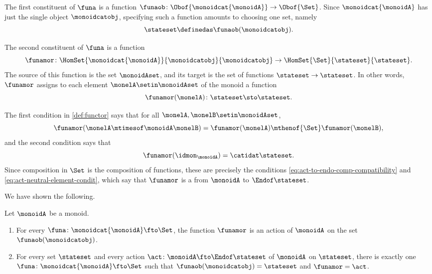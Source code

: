 The first constituent of $\funa$ is a function $\funaob \colon \Obof{\monoidcat{\monoidA}} \to \Obof{\Set}$.
Since $\monoidcat{\monoidA}$ has just the single object $\monoidcatobj$, specifying such a function amounts to choosing one set, namely
\begin{equation}
    \stateset \definedas \funaob(\monoidcatobj).
\end{equation}

The second constituent of $\funa$ is a function
\begin{equation}
    \funamor \colon \HomSet{\monoidcat{\monoidA}}{\monoidcatobj}{\monoidcatobj} \to \HomSet{\Set}{\stateset}{\stateset}.
\end{equation}
The source of this function is the set $\monoidAset$, and its target is the set of functions $\stateset \to \stateset$.
In other words, $\funamor$ assigns to each element $\monelA \setin \monoidAset$ of the monoid a function
\begin{equation}
    \funamor(\monelA) \colon \stateset \sto \stateset.
\end{equation}

The first condition in \cref{def:functor} says that for all $\monelA, \monelB \setin \monoidAset$,
\begin{equation}
    \funamor(\monelA \mtimesof\monoidA \monelB) = \funamor(\monelA) \mthenof{\Set} \funamor(\monelB),
\end{equation}
and the second condition says that
\begin{equation}
    \funamor(\idmon_\monoidA) = \catidat\stateset.
\end{equation}
Since composition in $\Set$ is the composition of functions, these are precisely the conditions \cref{eq:act-to-endo-comp-compatibility} and \cref{eq:act-neutral-element-condit}, which say that $\funamor$ is a  from $\monoidA$ to $\Endof\stateset$.

We have shown the following.

\begin{lemma}
    \label{lem:monoid-action-as-functor}
    Let $\monoidA$ be a monoid.
    \begin{enumerate}
        \item For every  $\funa \colon \monoidcat{\monoidA} \fto \Set$, the function $\funamor$ is an action of $\monoidA$ on the set $\funaob(\monoidcatobj)$.
        \item For every set $\stateset$ and every action $\act \colon \monoidA \fto \Endof\stateset$ of $\monoidA$ on $\stateset$, there is exactly one  $\funa \colon \monoidcat{\monoidA} \fto \Set$ such that $\funaob(\monoidcatobj) = \stateset$ and $\funamor = \act$.
    \end{enumerate}
\end{lemma}


